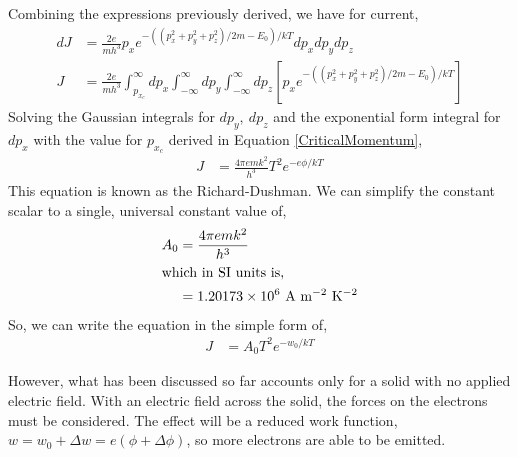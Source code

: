 Combining the expressions previously derived, we have for current,
\begin{align}
    dJ &= \frac{2e}{mh^3} p_x e^{-((p_x^2+p_y^2 + p_z^2)/2m - E_0)/kT} dp_x dp_y dp_z \\
    J &= \frac{2e}{mh^3} \int_{p_{x_c}}^\infty dp_x \int_{-\infty}^\infty dp_y \int_{-\infty}^\infty dp_z \left[ p_x e^{-((p_x^2+p_y^2 + p_z^2)/2m - E_0)/kT} \right]
\end{align}
Solving the Gaussian integrals for $dp_y,\ dp_z$ and the exponential form integral for $dp_x$ with the value for $p_{x_c}$ derived in Equation \ref{CriticalMomentum},
\begin{align}
    J &= \frac{4\pi e m k^2 }{h^3} T^2 e^{-e\phi/kT}
\end{align}
This equation is known as the Richard-Dushman. We can simplify the constant scalar to a single, universal constant value of,
\begin{align}
    A_0 &= \frac{4\pi e m k^2 }{h^3} \\
    \intertext{which in SI units is,}
    &= 1.20173 \times 10^6 \ \text{A m$^{-2}$ K$^{-2}$}
\end{align}
So, we can write the equation in the simple form of,
\begin{align}
    J &= A_0 T^2e^{-w_0/kT} \label{Richard-Dushman_reduced}
\end{align}

However, what has been discussed so far accounts only for a solid with no applied electric field. With an electric field across the solid, the forces on the electrons must be considered. The effect will be a reduced work function, $w = w_0 + \Delta w = e(\phi + \Delta \phi)$, so more electrons are able to be emitted. \\

